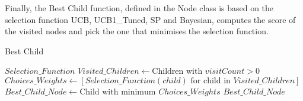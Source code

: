 Finally, the Best Child function, defined in the Node class is based on the selection function UCB, UCB1\_Tuned, SP and Bayesian, computes the score of the visited nodes and pick the one that minimises the selection function.

\begin{algorithm}[H]
    \caption{Best Child}
    \label{alg:Best Child}
    \begin{algorithmic}[1]
        \REQUIRE $Selection\_Function$
        \STATE $Visited\_Children \leftarrow \text{Children with } visitCount > 0$
        \STATE $Choices\_Weights \leftarrow \left[ Selection\_Function(child) \text{ for child in } Visited\_Children \right]$
        \STATE $Best\_Child\_Node \leftarrow \text{Child with minimum } Choices\_Weights$
        \RETURN $Best\_Child\_Node$
    \end{algorithmic}
\end{algorithm}